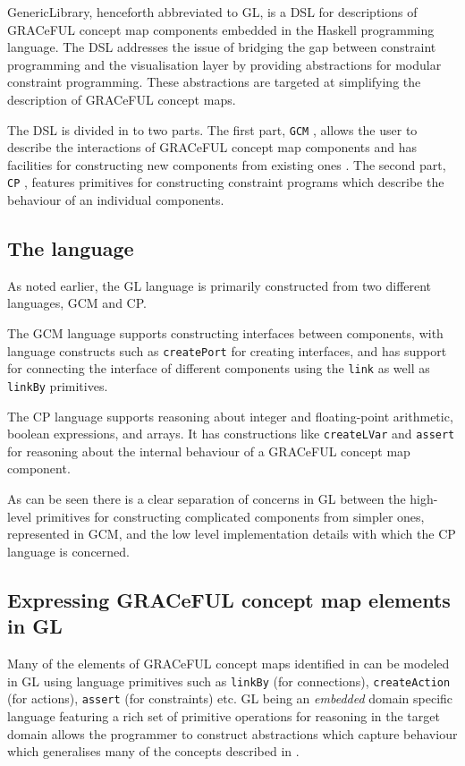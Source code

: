 GenericLibrary, henceforth abbreviated to GL, is a DSL for descriptions
of GRACeFUL concept map components embedded in the Haskell programming language.
The DSL addresses the issue of bridging the gap between constraint programming
and the visualisation layer by providing abstractions for modular constraint programming.
These abstractions are targeted at simplifying the description of GRACeFUL concept maps.

The DSL is divided in to two parts. The first part, \texttt{GCM} ,
allows the user to describe the interactions of GRACeFUL concept map components
and has facilities for constructing new components from existing ones . The second part,
\texttt{CP} , features primitives for constructing constraint programs
which describe the behaviour of an individual components.


\subsection{The language}
As noted earlier, the GL language is primarily constructed from two different languages,
GCM and CP.

The GCM language supports constructing interfaces between components,
with language constructs such as \texttt{createPort} for creating interfaces, and has support for
connecting the interface of different components using the \texttt{link}
as well as \texttt{linkBy} primitives.

The CP language supports reasoning about integer and floating-point arithmetic, boolean expressions,
and arrays. It has constructions like \texttt{createLVar} and \texttt{assert} for reasoning about
the internal behaviour of a GRACeFUL concept map component.

As can be seen there is a clear separation of concerns in GL between the high-level primitives
for constructing complicated components from simpler ones, represented in GCM, and the low level
implementation details with which the CP language is concerned.

\subsection{Expressing GRACeFUL concept map elements in GL}
Many of the elements of GRACeFUL concept maps identified in \cite{d4.1} can be modeled in
GL using language primitives such as \texttt{linkBy} (for connections),
\texttt{createAction} (for actions), \texttt{assert} (for constraints) etc.
GL being an \textit{embedded} domain specific language featuring a rich set of primitive
operations for reasoning in the target domain allows the programmer to construct
abstractions which capture behaviour which generalises many of the concepts described
in \cite{d4.1}.
